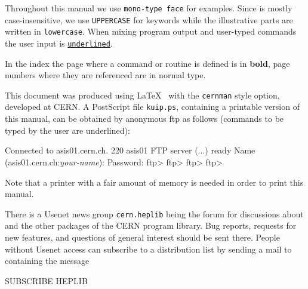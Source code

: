 Throughout this manual we use \texttt{mono-type face} for examples.
Since \KUIP{} is mostly case-insensitive, we use \texttt{UPPERCASE} for
keywords while the illustrative parts are written in
\texttt{lowercase}.
When mixing program output and user-typed commands the user input is
\texttt{\underline{underlined}}.

In the index the page where a command or routine is defined is in {\bf bold},
page numbers where they are referenced are in normal type.

This document was produced using \LaTeX~\cite{bib-LATEX}
with the {\tt cernman} style option, developed at CERN. 
A PostScript file {\tt kuip.ps}, containing a printable version
of this manual, can be obtained by anonymous ftp as follows
(commands to be typed by the user are underlined):      

\begin{XMP}
Connected to asis01.cern.ch.
220 asis01 FTP server (...) ready
Name (asis01.cern.ch:\textsl{your-name}): 
Password: 
ftp> 
ftp> 
ftp> 
ftp> 
\end{XMP}
Note that a printer with a fair amount of memory is needed in order to
print this manual.

There is a Usenet news group \texttt{cern.heplib} being the forum for
discussions about \KUIP{} and the other packages of the CERN program library.
Bug reports, requests for new features, and questions of general
interest should be sent there.
People without Usenet access can subscribe to a distribution list by
sending a mail to  containing the
message
\begin{XMP}
SUBSCRIBE HEPLIB
\end{XMP}

\newpage 
\tableofcontents
\newpage
\listoftables
\newpage
\listoffigures
